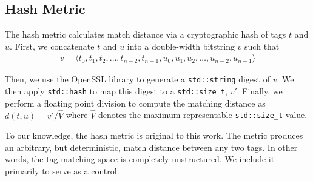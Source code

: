 \subsection{Hash Metric} \label{sec:hash}

The hash metric calculates match distance via a cryptographic hash of tags $t$ and $u$.
First, we concatenate $t$ and $u$ into a double-width bitstring $v$ such that
\begin{align*}
v = \langle t_0, t_1, t_2, \dots, t_{n-2}, t_{n-1}, u_0, u_1, u_2, \dots, u_{n-2}, u_{n-1} \rangle
\end{align*}

Then, we use the OpenSSL library to generate a \texttt{std::string} digest of $v$.
We then apply \texttt{std::hash} to map this digest to a \texttt{std::size\_t}, $v'$.
Finally, we perform a floating point division to compute the matching distance as $d(t, u) = v' / \hat{V}$ where $\hat{V}$  denotes the maximum representable \texttt{std::size\_t} value.

To our knowledge, the hash metric is original to this work.
The metric produces an arbitrary, but deterministic, match distance between any two tags.
In other words, the tag matching space is completely unstructured.
We include it primarily to serve as a control.
